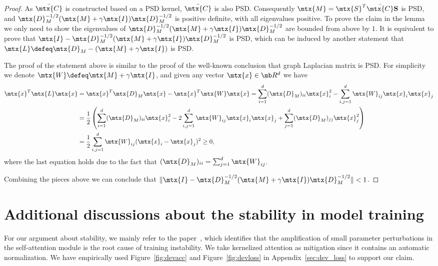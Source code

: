 \documentclass{article}
\begin{document}
\begin{proof}
As $\bar{\mtx{C}}$ is constructed based on a PSD kernel, $\bar{\mtx{C}}$ is also PSD.
Consequently $\mtx{M} = \mtx{S}^{T} \bar{\mtx{C}} \textbf{S}$ is PSD, and $\mtx{D}_M^{-1/2} (\mtx{M} + \gamma \mtx{I}) \mtx{D}_M^{-1/2}$ is positive definite, with all eigenvalues positive.
To prove the claim in the lemma we only need to show the eigenvalues of $\mtx{D}_M^{-1/2} (\mtx{M} + \gamma \mtx{I}) \mtx{D}_M^{-1/2}$ are bounded from above by $1$.
It is equivalent to prove that $\mtx{I} - \mtx{D}_M^{-1/2} (\mtx{M} + \gamma \mtx{I}) \mtx{D}_M^{-1/2}$ is PSD,
which can be induced by another statement that $\mtx{L} \defeq \mtx{D}_M - (\mtx{M} + \gamma \mtx{I})$ is PSD.

The proof of the statement above is similar to the proof of the well-known conclusion that graph Laplacian matrix is PSD.
For simplicity we denote $\mtx{W} \defeq \mtx{M} + \gamma \mtx{I}$, and given any vector $\mtx{x} \in \mb R^d$ we have
\begin{align*}
\mtx{x}^T \mtx{L} \mtx{x} &= \mtx{x}^T \mtx{D}_M \mtx{x} - \mtx{x}^T \mtx{W} \mtx{x}
= \sum_{i=1}^d (\mtx{D}_M)_{ii} \mtx{x}_i^2 - \sum_{i,j=1}^d \mtx{W}_{ij} \mtx{x}_i \mtx{x}_j \\
&= \frac12 \left( \sum_{i=1}^d (\mtx{D}_M)_{ii} \mtx{x}_i^2 - 2\sum_{i,j=1}^d \mtx{W}_{ij} \mtx{x}_i \mtx{x}_j + \sum_{j=1}^d (\mtx{D}_M)_{jj} \mtx{x}_j^2 \right) \\
&= \frac12 \sum_{i,j=1}^d \mtx{W}_{ij} (\mtx{x}_i - \mtx{x}_j)^2 \geq 0,
\end{align*}
where the last equation holds due to the fact that $(\mtx{D}_M)_{ii} = \sum_{j=1}^d \mtx{W}_{ij}$.

Combining the pieces above we can conclude that $\|\mtx{I} - \mtx{D}_M^{-1/2} (\mtx{M} + \gamma \mtx{I}) \mtx{D}_M^{-1/2}\| < 1$.
\end{proof}


\section{Additional discussions about the stability in model training}
\label{sec:exp_stability}

For our argument about stability, we mainly refer to the paper~\citep{DBLP:conf/emnlp/LiuLGCH20}, 
which identifies that the amplification of small parameter perturbations in the self-attention module is the root cause of training instability. 
We take kernelized attention as mitigation since it contains an automatic normalization. 
We have empirically used Figure~\ref{fig:devacc} and Figure~\ref{fig:devloss} in Appendix~\ref{sec:dev_loss} to support our claim. 
\end{document}
